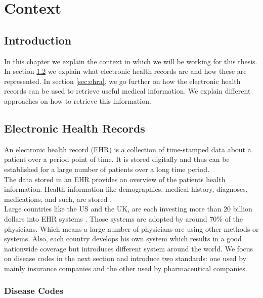\graphicspath{ {Context/Images/} }


\chapter{Context}
\label{cha:context}

\section{Introduction}

In this chapter we explain the context in which we will be working for this thesis. \\

In section \ref{sec:ehr} we explain what electronic health records are and how these are represented. In section \ref{sec:ehra}, we go further on how the electronic health records can be used to retrieve useful medical information. We explain different approaches on how to retrieve this information.


\section{Electronic Health Records}
\label{sec:ehr}

An electronic health record (EHR) is a collection of time-stamped data about a patient over a period point of time. It is stored digitally and thus can be established for a large number of patients over a long time period. \\
The data stored in an EHR provides an overview of the patients health information. Health information like demographics, medical history, diagnoses, medications, and such, are stored \cite{HealthIT:online}. \\

Large countries like the US and the UK, are each investing more than $20$ billion dollars into EHR systems \cite{EHRworld:article}. Those systems are adopted by around $70$\% of the physicians. Which means a large number of physicians are using other methods or systems. Also, each country develops his own system which results in a good nationwide coverage but introduces different system around the world. We focus on disease codes in the next section and introduce two standards: one used by mainly insurance companies and the other used by pharmaceutical companies.


\subsection{Disease Codes}

